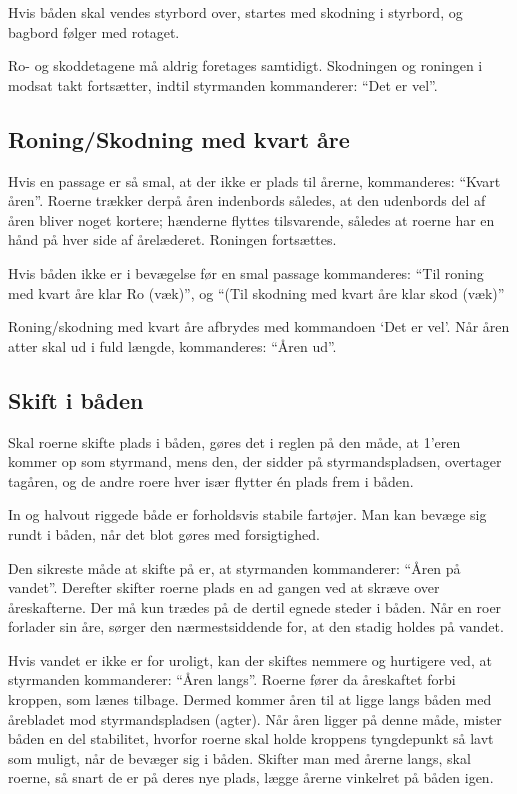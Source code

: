 \documentclass{article}
\begin{document}
Hvis båden skal vendes styrbord over, startes med skodning i styrbord, og
bagbord følger med rotaget.

Ro- og skoddetagene må aldrig foretages samtidigt. Skodningen og roningen
i modsat takt fortsætter, indtil styrmanden kommanderer: ``Det er vel''.

\subsection{Roning/Skodning med kvart åre}

Hvis en passage er så smal, at der ikke er plads til årerne, kommanderes:
``Kvart åren''. Roerne trækker derpå åren indenbords således, at den
udenbords del af åren bliver noget kortere; hænderne flyttes tilsvarende,
således at roerne har en hånd på hver side af årelæderet. Roningen
fortsættes.

Hvis båden ikke er i bevægelse før en smal passage kommanderes: ``Til
roning med kvart åre klar Ro (væk)'', og ``(Til skodning med
kvart åre klar skod (væk)''

Roning/skodning med kvart åre afbrydes med kommandoen `Det er vel'. Når
åren atter skal ud i fuld længde, kommanderes: ``Åren ud''.

\subsection{Skift i båden}

Skal roerne skifte plads i båden, gøres det i reglen på den måde, at
1’eren kommer op som styrmand, mens den, der sidder på styrmandspladsen,
overtager tagåren, og de andre roere hver især flytter én plads frem i
båden.

In og halvout riggede både er forholdsvis stabile fartøjer. Man kan
bevæge sig rundt i båden, når det blot gøres med forsigtighed.

Den sikreste måde at skifte på er, at styrmanden kommanderer: ``Åren på
vandet''. Derefter skifter roerne plads en ad gangen ved at skræve over
åreskafterne. Der må kun trædes på de dertil egnede steder i båden. Når
en roer forlader sin åre, sørger den nærmestsiddende for, at den stadig
holdes på vandet.

Hvis vandet er ikke er for uroligt, kan der skiftes nemmere og hurtigere
ved, at styrmanden kommanderer: ``Åren langs''. Roerne fører da
åreskaftet forbi kroppen, som lænes tilbage. Dermed kommer åren til at
ligge langs båden med årebladet mod styrmandspladsen (agter). Når åren
ligger på denne måde, mister båden en del stabilitet, hvorfor roerne skal
holde kroppens tyngdepunkt så lavt som muligt, når de bevæger sig i
båden.  Skifter man med årerne langs, skal roerne, så snart de er på
deres nye plads, lægge årerne vinkelret på båden igen.
\end{document}
